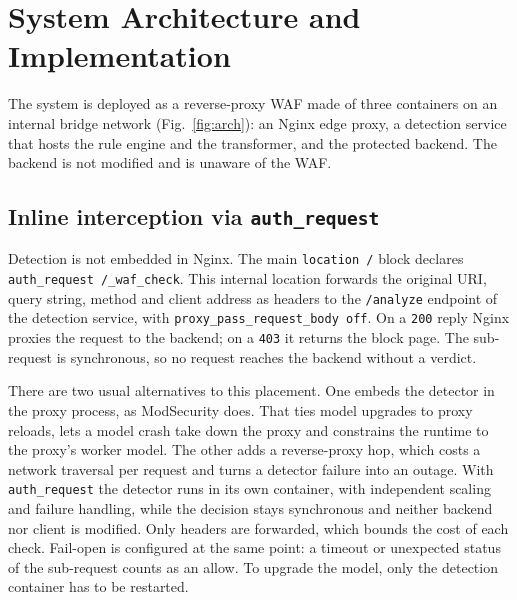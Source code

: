 \documentclass[preprint,11pt]{elsarticle}
\begin{document}
\section{System Architecture and Implementation}
\label{sec:arch}
The system is deployed as a reverse-proxy WAF made of three containers on
an internal bridge network (Fig.~\ref{fig:arch}): an Nginx edge proxy, a
detection service that hosts the rule engine and the transformer, and the
protected backend. The backend is not modified and is unaware of the WAF.

\subsection{Inline interception via \texttt{auth\_request}}
Detection is not embedded in Nginx. The main \texttt{location /} block
declares \texttt{auth\_request /\_waf\_check}. This internal location
forwards the original URI, query string, method and client address as
headers to the \texttt{/analyze} endpoint of the detection service, with
\texttt{proxy\_pass\_request\_body off}. On a \texttt{200} reply Nginx
proxies the request to the backend; on a \texttt{403} it returns the block
page. The sub-request is synchronous, so no request reaches the backend
without a verdict.

There are two usual alternatives to this placement. One embeds the detector
in the proxy process, as ModSecurity does. That ties model upgrades to
proxy reloads, lets a model crash take down the proxy and constrains the
runtime to the proxy's worker model. The other adds a reverse-proxy hop,
which costs a network traversal per request and turns a detector failure
into an outage. With \texttt{auth\_request} the detector runs in its own
container, with independent scaling and failure handling, while the
decision stays synchronous and neither backend nor client is modified. Only
headers are forwarded, which bounds the cost of each check. Fail-open is
configured at the same point: a timeout or unexpected status of the
sub-request counts as an allow. To upgrade the model, only the detection
container has to be restarted.
\end{document}
